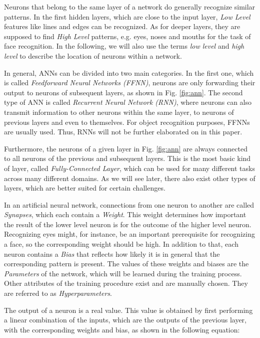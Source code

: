 \documentclass[conference]{IEEEtran}
\begin{document}
Neurons that belong to the same layer of a network do generally recognize similar patterns. In the first hidden layers, which are close to the input layer, \emph{Low Level} features like lines and edges can be recognized. As for deeper layers, they are supposed to find \emph{High Level} patterns, e.g. eyes, noses and mouths for the task of face recognition. In the following, we will also use the terms \emph{low level} and \emph{high level} to describe the location of neurons within a network.

In general, ANNs can be divided into two main categories. In the first one, which is called \emph{Feedforward Neural Networks (FFNN)}, neurons are only forwarding their output to neurons of subsequent layers, as shown in Fig. \ref{fig:ann}. The second type of ANN is called \emph{Recurrent Neural Network (RNN)}, where neurons can also transmit information to other neurons within the same layer, to neurons of previous layers and even to themselves. For object recognition purposes, FFNNs are usually used. Thus, RNNs will not be further elaborated on in this paper.

Furthermore, the neurons of a given layer in Fig. \ref{fig:ann} are always connected to all neurons of the previous and subsequent layers. This is the most basic kind of layer, called \emph{Fully-Connected Layer}, which can be used for many different tasks across many different domains. As we will see later, there also exist other types of layers, which are better suited for certain challenges.

In an artificial neural network, connections from one neuron to another are called \emph{Synapses}, which each contain a \emph{Weight}. This weight determines how important the result of the lower level neuron is for the outcome of the higher level neuron. Recognizing eyes might, for instance, be an important prerequisite for recognizing a face, so the corresponding weight should be high. In addition to that, each neuron contains a \emph{Bias} that reflects how likely it is in general that the corresponding pattern is present. The values of these weights and biases are the \emph{Parameters} of the network, which will be learned during the training process. Other attributes of the training procedure exist and are manually chosen. They are referred to as \emph{Hyperparameters}. 

The output of a neuron is a real value. This value is obtained by first performing a linear combination of the inputs, which are the outputs of the previous layer, with the corresponding weights and bias, as shown in the following equation:
\end{document}
